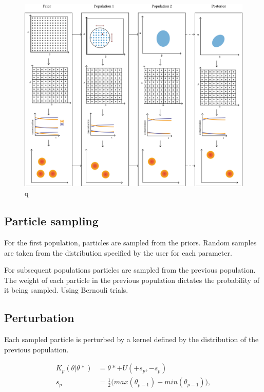 {\begin{figure}[h]
\begin{center}
\includegraphics[scale=0.5]{chapterStabilityFinder/images/process_overv.png}
\caption[LoF caption]{q}
\end{center}
\end{figure}
\clearpage

\subsection{Particle sampling}
For the first population, particles are sampled from the priors. Random samples are taken from the distribution specified by the user for each parameter. 

For subsequent populations particles are sampled from the previous population. The weight of each particle in the previous population dictates the probability of it being sampled. Using Bernouli trials.

\subsection{Perturbation}
Each sampled particle is perturbed by a kernel defined by the distribution of the previous population. 

\begin{align*}
K_p(\theta|\theta* ) &= \theta* + U(+s_p, -s_p) \\
s_p &= \frac{1}{2} \big (max(\theta_{p-1}) - min(\theta_{p-1}) \big ),
\end{align*}

}
